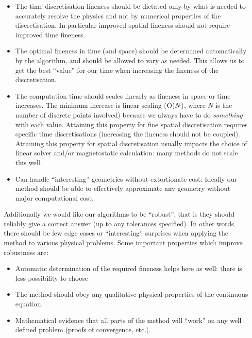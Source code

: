 \begin{itemize}
\item The time discretisation fineness should be dictated only by what is needed to accurately resolve the physics and not by numerical properties of the discretisation.
  In particular improved spatial fineness should not require improved time fineness.

\item The optimal fineness in time (and space) should be determined automatically by the algorithm, and should be allowed to vary as needed.
  This allows us to get the best ``value'' for our time when increasing the fineness of the discretisation.

\item The computation time should scales linearly as fineness in space or time increases.
  The minimum increase is linear scaling ($\mathrm{O}{\left( N \right)}$, where $N$ is the number of discrete points involved) because we always have to do \emph{something} with each value.
  Attaining this property for fine spatial discretisation requires specific time discretisations (\ie increasing the fineness should not be coupled).
  Attaining this property for spatial discretisation usually impacts the choice of linear solver and/or magnetostatic calculation: many methods do not scale this well.

\item Can handle ``interesting'' geometries without extortionate cost:
  Ideally our method should be able to effectively approximate any geometry without major computational cost.
\end{itemize}

Additionally we would like our algorithms to be ``robust'', that is they should reliably give a correct answer (up to any tolerances specified).
In other words there should be few edge cases or ``interesting'' surprises when applying the method to various physical problems.
Some important properties which improve robustness are:
\begin{itemize}
\item Automatic determination of the required fineness helps here as well: there is less possibility to choose

\item The method should obey any qualitative physical properties of the continuous equation.

\item Mathematical evidence that all parts of the method will ``work'' on any well defined problem (\eg proofs of convergence, etc.).
\end{itemize}

